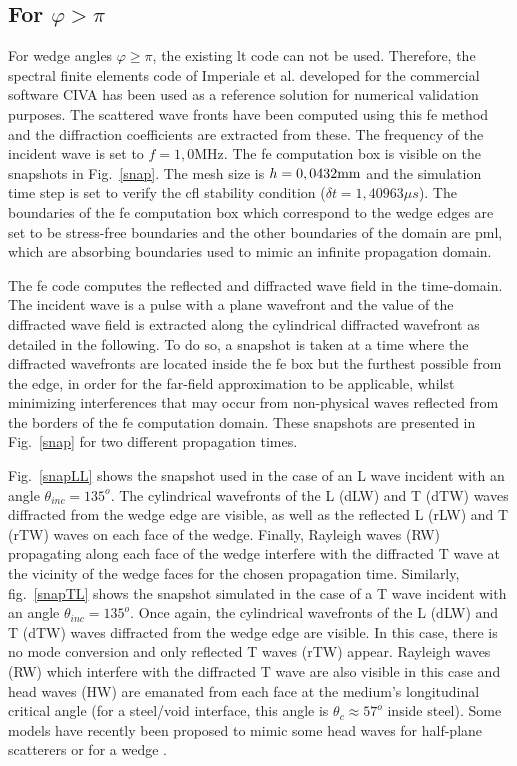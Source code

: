 \subsection{For $\varphi>\pi$}
For wedge angles $\varphi \geq \pi$, the existing \acrshort{lt} code can not be used. Therefore, the spectral finite elements code of Imperiale et al. developed for the commercial software CIVA \cite{imperiale_ut_2017} has been used as a reference solution for numerical validation purposes. The scattered wave fronts have been computed using this \acrfull{fe} method and the diffraction coefficients are extracted from these. The frequency of the incident wave is set to $f=1,0$MHz. The \acrshort{fe} computation box is visible on the snapshots in Fig.~\ref{snap}. The mesh size is $h=0,0432 \rm mm$ and the simulation time step is set to verify the \acrfull{cfl} stability condition ($\delta t=1,40963 \mu s$). The boundaries of the \acrshort{fe} computation box which correspond to the wedge edges are set to be stress-free boundaries and the other boundaries of the domain are \acrfull{pml}, which are absorbing boundaries used to mimic an infinite propagation domain.

The \acrshort{fe} code computes the reflected and diffracted wave field in the time-domain. The incident wave is a pulse with a plane wavefront and the value of the diffracted wave field is extracted along the cylindrical diffracted wavefront as detailed in the following. To do so, a snapshot is taken at a time where the diffracted wavefronts are located inside the \acrshort{fe} box but the furthest possible from the edge, in order for the far-field approximation to be applicable, whilst minimizing interferences that may occur from non-physical waves reflected from the borders of the \acrshort{fe} computation domain. These snapshots are presented in Fig.~\ref{snap} for two different propagation times. 

Fig.~\ref{snapLL} shows the snapshot used in the case of an L wave incident with an angle $\theta_{inc}=135^o$. The cylindrical wavefronts of the L (dLW) and T (dTW) waves diffracted from the wedge edge are visible, as well as the reflected L (rLW) and T (rTW) waves on each face of the wedge. Finally, Rayleigh waves (RW) propagating along each face of the wedge interfere with the diffracted T wave at the vicinity of the wedge faces for the chosen propagation time. 
Similarly, fig.~\ref{snapTL} shows the snapshot simulated in the case of a T wave incident with an angle $\theta_{inc}=135^o$. Once again, the cylindrical wavefronts of the L (dLW) and T (dTW) waves diffracted from the wedge edge are visible. In this case, there is no mode conversion and only reflected T waves (rTW) appear. Rayleigh waves (RW) which interfere with the diffracted T wave are also visible in this case and head waves (HW) are emanated from each face at the medium's longitudinal critical angle (for a steel/void interface, this angle is $\theta_c \approx 57^o$  inside steel). Some models have recently been proposed to mimic some head waves for half-plane scatterers \cite{PTDdarmon, FradkinDarmon} or for a wedge \cite{Zernovcrit}.

